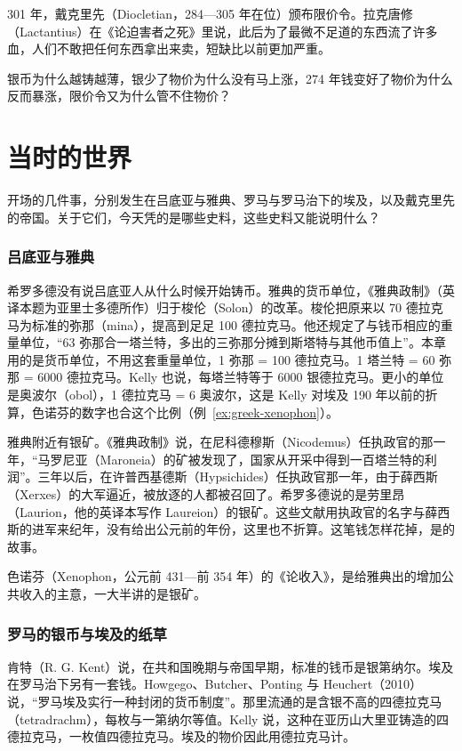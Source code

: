 301 年，戴克里先（Diocletian，284—305 年在位）颁布限价令\cite{kent1920}。拉克唐修（Lactantius）在《论迫害者之死》里说，此后为了最微不足道的东西流了许多血，人们不敢把任何东西拿出来卖，短缺比以前更加严重\cite{lactantius}。

银币为什么越铸越薄，银少了物价为什么没有马上涨，274 年钱变好了物价为什么反而暴涨，限价令又为什么管不住物价？

\section{当时的世界}\label{sec:greek-world}

开场的几件事，分别发生在吕底亚与雅典、罗马与罗马治下的埃及，以及戴克里先的帝国。关于它们，今天凭的是哪些史料，这些史料又能说明什么？

\subsubsection{吕底亚与雅典}
希罗多德没有说吕底亚人从什么时候开始铸币。雅典的货币单位，《雅典政制》（英译本题为亚里士多德所作）归于梭伦（Solon）的改革。梭伦把原来以 70 德拉克马为标准的弥那（mina），提高到足足 100 德拉克马。他还规定了与钱币相应的重量单位，“63 弥那合一塔兰特，多出的三弥那分摊到斯塔特与其他币值上”\cite{athpol}。本章用的是货币单位，不用这套重量单位，1 弥那 = 100 德拉克马。1 塔兰特 = 60 弥那 = 6000 德拉克马。Kelly 也说，每塔兰特等于 6000 银德拉克马。更小的单位是奥波尔（obol），1 德拉克马 = 6 奥波尔，这是 Kelly 对埃及 190 年以前的折算\cite{kelly2021}，色诺芬的数字也合这个比例（例~\ref{ex:greek-xenophon}）。

雅典附近有银矿。《雅典政制》说，在尼科德穆斯（Nicodemus）任执政官的那一年，“马罗尼亚（Maroneia）的矿被发现了，国家从开采中得到一百塔兰特的利润”。三年以后，在许普西基德斯（Hypsichides）任执政官那一年，由于薛西斯（Xerxes）的大军逼近，被放逐的人都被召回了\cite{athpol}。希罗多德说的是劳里昂（Laurion，他的英译本写作 Laureion）的银矿\cite{herodotus}。这些文献用执政官的名字与薛西斯的进军来纪年，没有给出公元前的年份，这里也不折算。这笔钱怎样花掉，是的故事。

色诺芬（Xenophon，公元前 431—前 354 年）的《论收入》，是给雅典出的增加公共收入的主意，一大半讲的是银矿\cite{xenrev}。

\subsubsection{罗马的银币与埃及的纸草}
肯特（R. G. Kent）说，在共和国晚期与帝国早期，标准的钱币是银第纳尔\cite{kent1920}。埃及在罗马治下另有一套钱。Howgego、Butcher、Ponting 与 Heuchert（2010）说，“罗马埃及实行一种封闭的货币制度”。那里流通的是含银不高的四德拉克马（tetradrachm），每枚与一第纳尔等值\cite{howgego2010}。Kelly 说，这种在亚历山大里亚铸造的四德拉克马，一枚值四德拉克马\cite{kelly2021}。埃及的物价因此用德拉克马计。

